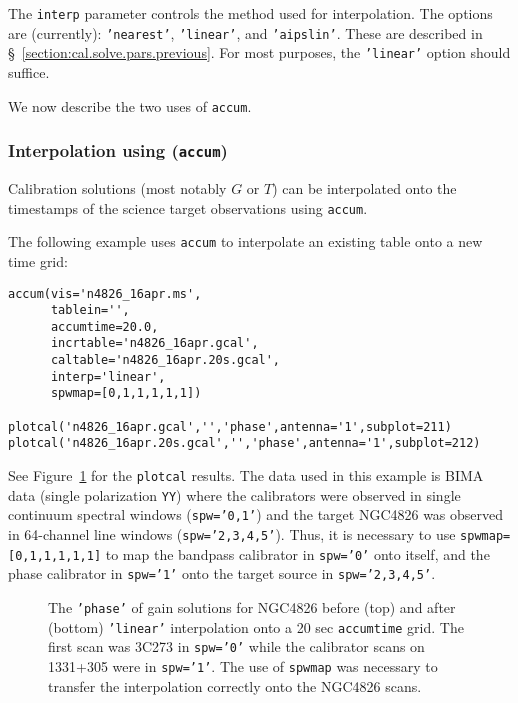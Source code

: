 The {\tt interp} parameter controls the method used for interpolation.
The options are (currently): {\tt 'nearest'}, {\tt 'linear'}, and
{\tt 'aipslin'}.
These are described in \S~\ref{section:cal.solve.pars.previous}.
For most purposes, the {\tt 'linear'} option should suffice.

We now describe the two uses of {\tt accum}.

\subsubsection{Interpolation using ({\tt accum})}
\label{section:cal.tables.accum.interp}

Calibration solutions (most notably $G$ or $T$) can be interpolated
onto the timestamps of the science target observations using {\tt accum}.  

The following example uses {\tt accum} to interpolate an existing
table onto a new time grid:
\small
\begin{verbatim}
accum(vis='n4826_16apr.ms',
      tablein='',
      accumtime=20.0,
      incrtable='n4826_16apr.gcal',
      caltable='n4826_16apr.20s.gcal',
      interp='linear',
      spwmap=[0,1,1,1,1,1])

plotcal('n4826_16apr.gcal','','phase',antenna='1',subplot=211)
plotcal('n4826_16apr.20s.gcal','','phase',antenna='1',subplot=212)
\end{verbatim}
\normalsize
See Figure~\ref{fig:accum_interp} for the {\tt plotcal} results.
The data used in this example is BIMA data (single polarization 
{\tt  YY}) where the calibrators were observed in single continuum
spectral windows ({\tt spw='0,1'}) and the target NGC4826 was observed
in 64-channel line windows ({\tt spw='2,3,4,5'}).  Thus, it is 
necessary to use {\tt spwmap=[0,1,1,1,1,1]} to map the bandpass
calibrator in {\tt spw='0'} onto itself, and the phase calibrator 
in {\tt spw='1'} onto the target source in {\tt spw='2,3,4,5'}.

\begin{figure}[h!]
\begin{center}
\caption{\label{fig:accum_interp} The {\tt 'phase'} of gain solutions
for NGC4826 before (top) and after (bottom) {\tt 'linear'} interpolation onto
a 20 sec {\tt accumtime} grid.  The first scan was 3C273 in {\tt spw='0'} 
while the calibrator scans on 1331+305 were in {\tt spw='1'}.  The use of 
{\tt spwmap} was necessary to transfer the interpolation correctly
onto the NGC4826 scans.
}
\hrulefill
\end{center}
\end{figure}



